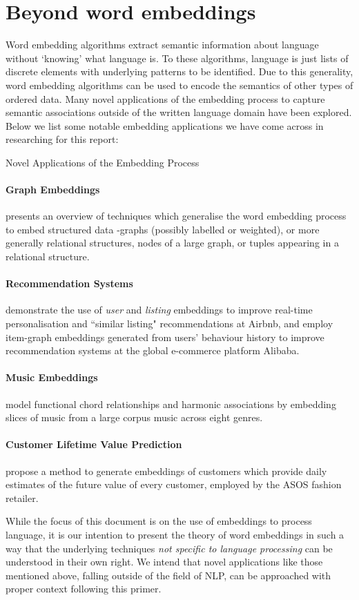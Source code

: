 \documentclass{ucetd}
\begin{document}
\section{Beyond word embeddings}\label{chap:beyond-word-embeddings}
Word embedding algorithms extract semantic information about language without `knowing' what language is. To these algorithms, language is just lists of discrete elements with underlying patterns to be identified. Due to this generality, word embedding algorithms can be used to encode the semantics of other types of ordered data.
Many novel applications of the embedding process to capture semantic associations outside of the written language domain have been explored. Below we list some notable embedding applications we have come across in researching for this report:
\par
\begin{infobox}{Novel Applications of the Embedding Process}
  \paragraph{Graph Embeddings} \textcite{grohe20-word2-node2} presents an overview of techniques which generalise the word embedding process to embed structured data -graphs (possibly labelled or weighted), or more generally relational structures, nodes of a large graph, or tuples appearing in a relational structure.
  \paragraph{Recommendation Systems} \textcite{grbovic-2018-real-time-personalization} demonstrate the use of \emph{user} and \emph{listing} embeddings to improve real-time personalisation and ``similar listing" recommendations at Airbnb, and \textcite{wang-2018-billion-scale-commodity-embedding} employ item-graph embeddings generated from users' behaviour history to improve recommendation systems at the global e-commerce platform Alibaba.
  \paragraph{Music Embeddings} \textcite{chuan-2018-from-context-to} model functional chord relationships and harmonic associations by embedding slices of music from a large corpus music across eight genres.
  \paragraph{Customer Lifetime Value Prediction} \textcite{chamberlain17-custom-lifet-value-predic-using-embed} propose a method to generate embeddings of customers which provide daily estimates of the future value of every customer, employed by the ASOS fashion retailer.
\end{infobox}
While the focus of this document is on the use of embeddings to process language, it is our intention to present the theory of word embeddings in such a way that the underlying techniques \emph{not specific to language processing} can be understood in their own right. We intend that novel applications like those mentioned above, falling outside of the field of NLP, can be approached with proper context following this primer.
\end{document}
